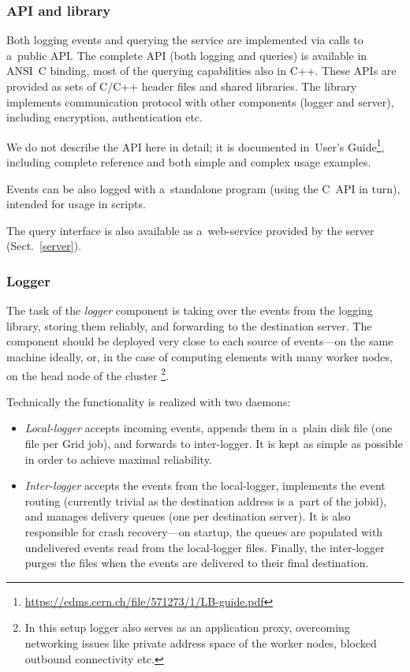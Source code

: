 \subsubsection{\LB API and library}
Both logging events and querying the service are implemented via
calls to a~public \LB API.
The complete API (both logging and queries)
is available in ANSI~C binding, most of the querying capabilities also in C++.
These APIs are provided as sets of C/C++ header files and shared libraries.
The library implements communication protocol with other \LB components
(logger and server), including encryption, authentication etc.

We do not describe the API here in detail; it is documented in~\LB User's
Guide\footnote{\url{https://edms.cern.ch/file/571273/1/LB-guide.pdf}},
including complete reference and both simple and complex usage examples.

Events can be also logged with a~standalone program (using the C~API in turn),
intended for usage in scripts.

The query interface is also available as a~web-service provided by the
\LB server (Sect.~\ref{server}).

\subsubsection{Logger}
The task of the \emph{logger} component is taking over the events from
the logging library, storing them reliably, and forwarding to the destination
server.
The component should be deployed very close to each source of events---on the
same machine ideally, or, in the case of computing elements with many
worker nodes, on the head node of the cluster%
\footnote{In this setup logger also serves as an application proxy,
overcoming networking issues like private address space of the worker nodes,
blocked outbound connectivity etc.}.

Technically the functionality is realized with two daemons:
\begin{itemize}
\item \emph{Local-logger} accepts incoming events,
appends them in a~plain disk file (one file per Grid job),
and forwards to inter-logger.
It is kept as simple as possible in order to achieve
maximal reliability. 
\item \emph{Inter-logger} accepts the events from the local-logger,
implements the event routing (currently trivial as the destination
address is a~part of the jobid), and manages
delivery queues (one per destination server).
It is also responsible for crash recovery---on startup, the queues are
populated with undelivered events read from the local-logger files.
Finally, the inter-logger purges the files when the events are delivered to
their final destination.
\end{itemize}

